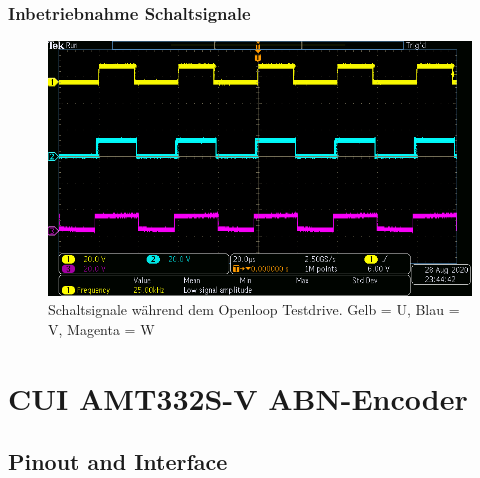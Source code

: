 \begin{appendix}
\newpage

\subsubsection{Inbetriebnahme Schaltsignale}\label{Appendix:H_Bruecke_Schaltsignale}

\begin{figure}[h!]
	\centering
	\includegraphics[width=\textwidth]{graphics/OpenLoop_TestDrive2}
	\caption{Schaltsignale während dem Openloop Testdrive. Gelb = U, Blau = V, Magenta = W}
	\label{fig:OpenLoop_TestDrive2}
\end{figure}

\newpage

\section{CUI AMT332S-V ABN-Encoder}\label{Appendix:ABC_Ecoder}

\subsection{Pinout and Interface}


\end{appendix}
